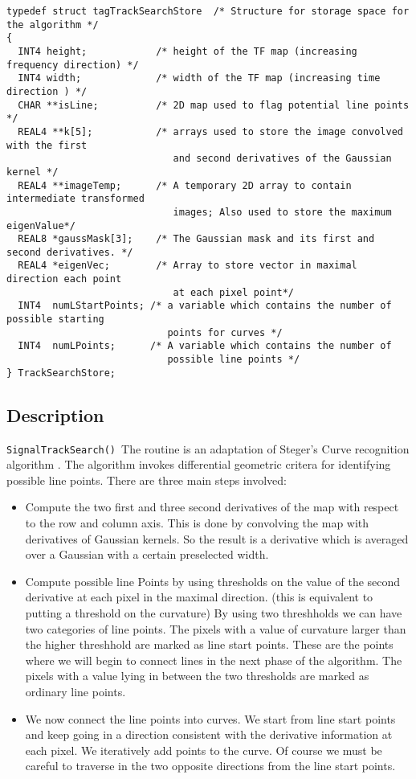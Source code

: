 \begin{verbatim}
typedef struct tagTrackSearchStore  /* Structure for storage space for the algorithm */
{
  INT4 height;            /* height of the TF map (increasing frequency direction) */
  INT4 width;             /* width of the TF map (increasing time direction ) */
  CHAR **isLine;          /* 2D map used to flag potential line points */
  REAL4 **k[5];           /* arrays used to store the image convolved with the first 
                             and second derivatives of the Gaussian kernel */
  REAL4 **imageTemp;      /* A temporary 2D array to contain intermediate transformed 
                             images; Also used to store the maximum eigenValue*/
  REAL8 *gaussMask[3];    /* The Gaussian mask and its first and second derivatives. */
  REAL4 *eigenVec;        /* Array to store vector in maximal direction each point 
                             at each pixel point*/  
  INT4  numLStartPoints; /* a variable which contains the number of possible starting 
                            points for curves */
  INT4  numLPoints;      /* A variable which contains the number of 
                            possible line points */
} TrackSearchStore;

\end{verbatim}

\subsection{Description}

{\tt SignalTrackSearch()}\ The routine is an adaptation of Steger's
Curve recognition algorithm \cite{Steger}. The algorithm invokes differential geometric critera for
identifying possible line points. There are three main steps involved:
\begin{itemize}
\item Compute the two first and three second derivatives of the map with
respect to the row and column axis. This is done by convolving the
map  with derivatives of Gaussian kernels. So the result is a
derivative which is averaged over a Gaussian with a certain
preselected width. 
\item	Compute possible line Points by using thresholds on the
value of the second derivative at each pixel in the maximal
direction. (this is equivalent to putting a threshold on the curvature)
By using two threshholds we can have two categories of line
points. The pixels with a value of curvature larger than the higher
threshhold are marked as line start points. These are the points where
we will begin to connect lines in the next phase of the algorithm. The
pixels with a value lying in between the two thresholds are marked as
ordinary line points.
\item We now connect the line points into curves. We start from line
start points and keep going in a direction consistent with the
derivative information at each pixel. We iteratively add points to the
curve. Of course we must be careful to traverse in the two opposite
directions from the line start points. 
\end{itemize}
